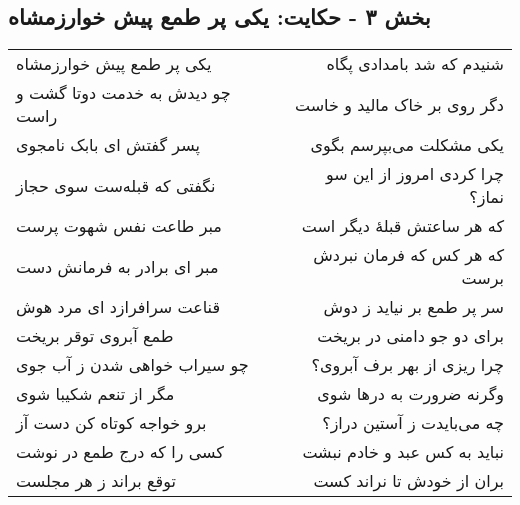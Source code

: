 \begin{center}
\section*{بخش ۳ - حکایت: یکی پر طمع پیش خوارزمشاه}
\label{sec:003}
\begin{longtable}{l p{0.5cm} r}
یکی پر طمع پیش خوارزمشاه
&&
شنیدم که شد بامدادی پگاه
\\
چو دیدش به خدمت دوتا گشت و راست
&&
دگر روی بر خاک مالید و خاست
\\
پسر گفتش ای بابک نامجوی
&&
یکی مشکلت می‌بپرسم بگوی
\\
نگفتی که قبله‌ست سوی حجاز
&&
چرا کردی امروز از این سو نماز؟
\\
مبر طاعت نفس شهوت پرست
&&
که هر ساعتش قبلهٔ دیگر است
\\
مبر ای برادر به فرمانش دست
&&
که هر کس که فرمان نبردش برست
\\
قناعت سرافرازد ای مرد هوش
&&
سر پر طمع بر نیاید ز دوش
\\
طمع آبروی توقر بریخت
&&
برای دو جو دامنی در بریخت
\\
چو سیراب خواهی شدن ز آب جوی
&&
چرا ریزی از بهر برف آبروی؟
\\
مگر از تنعم شکیبا شوی
&&
وگرنه ضرورت به درها شوی
\\
برو خواجه کوتاه کن دست آز
&&
چه می‌بایدت ز آستین دراز؟
\\
کسی را که درج طمع در نوشت
&&
نباید به کس عبد و خادم نبشت
\\
توقع براند ز هر مجلست
&&
بران از خودش تا نراند کست
\\
\end{longtable}
\end{center}

